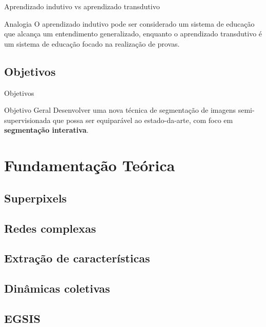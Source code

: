 \documentclass{templatebeamerufc/libs/ufc_format}
\begin{document}
\begin{frame}{Aprendizado indutivo vs aprendizado transdutivo}
  \begin{exampleblock}{Analogia}
    O aprendizado indutivo pode ser considerado um sistema de educação que
alcança um entendimento generalizado, enquanto o aprendizado
transdutivo é um sistema de educação focado na realização de provas.
  \end{exampleblock}
\end{frame}

\subsection{Objetivos}
\begin{frame}{Objetivos}
  \begin{alertblock}{Objetivo Geral}
    Desenvolver uma nova técnica de segmentação de imagens
    semi-supervisionada que possa ser equiparável ao estado-da-arte, com
    foco em \textbf{segmentação interativa}.
  \end{alertblock}
\end{frame}


\section{Fundamentação Teórica}
\subsection{Superpixels}
\subsection{Redes complexas}
\subsection{Extração de características}
\subsection{Dinâmicas coletivas}
\subsection{EGSIS}

\end{document}
